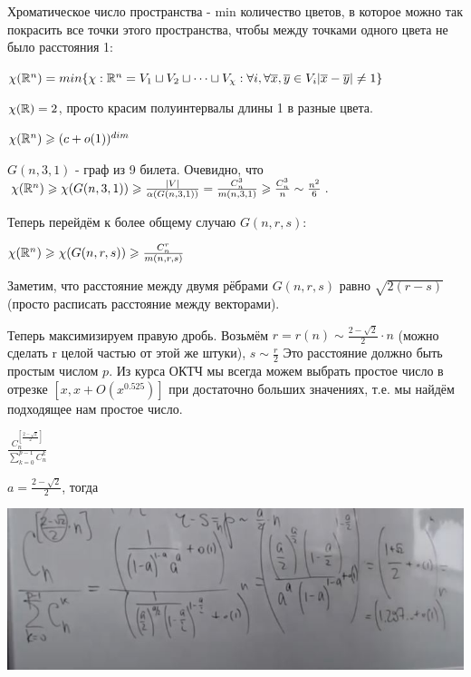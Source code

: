 \Def Хроматическое число пространства - min количество цветов, в которое можно так покрасить все точки этого пространства, чтобы между точками одного цвета не было расстояния 1:

$\chi(\mathbb{R}^n) = min \{\chi: \mathbb{R}^n = V_1 \sqcup V_2 \sqcup \dots \sqcup V_{\chi} : \forall i, \forall \overline{x}, \overline{y} \in V_i |\overline{x} - \overline{y}| \neq 1 \}$

\Example $\chi(\mathbb{R}) = 2$, просто красим полуинтервалы длины 1 в разные цвета.

\Th $\chi(\mathbb{R}^n) \geqslant (c + o(1))^{dim}$

\Proof
$G(n, 3, 1)$ - граф из 9 билета. Очевидно, что $\chi(\mathbb{R}^n) \geqslant \chi(G(n, 3, 1)) \geqslant \frac{|V|}{\alpha(G(n, 3, 1))} = \frac{C_n^3}{m(n, 3, 1)} \geqslant \frac{C_n^3}{n} \sim \frac{n^2}{6} $. 

Теперь перейдём к более общему случаю $G(n, r, s)$:

$\chi(\mathbb{R}^n) \geqslant \chi(G(n, r, s)) \geqslant \frac{C_n^r}{m(n, r, s)}$

Заметим, что расстояние между двумя рёбрами $G(n, r, s)$ равно $\sqrt{2(r-s)}$ (просто расписать расстояние между векторами).

Теперь максимизируем правую дробь. Возьмём $r = r(n) \sim \frac{2 - \sqrt{2}}{2} \cdot n$ (можно сделать r целой частью от этой же штуки), $s\sim \frac{r}{2}$
Это расстояние должно быть простым числом $p$. Из курса ОКТЧ мы всегда можем выбрать простое число в отрезке $[x, x+O(x^{0.525})]$ при достаточно больших значениях, т.е. мы найдём подходящее нам простое число.

$\frac{C_n^{[\frac{2 - \sqrt{2}}{2}]}}{\sum_{k=0}^{p-1} C_n^k}$

$a = \frac{2 - \sqrt{2}}{2}$, тогда 

\includegraphics[]{images/71_2.JPG}
\EndProof